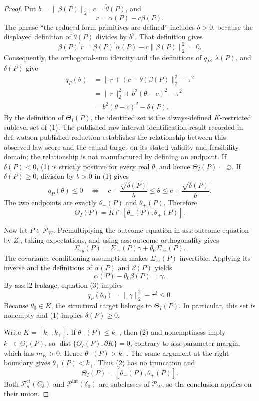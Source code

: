 \documentclass{article}
\begin{document}
\begin{proof}
Put \(b=\|\beta(P)\|_2\), \(c=\check\theta(P)\), and
\[
 r=\alpha(P)-c\beta(P).
\]
The phrase ``the reduced-form primitives are defined'' includes \(b>0\), because the displayed definition of \(\check\theta(P)\) divides by \(b^2\). That definition gives
\[
 \beta(P)^{\prime}r
 =\beta(P)^{\prime}\alpha(P)-c\|\beta(P)\|_2^2=0.
\]
Consequently, the orthogonal-sum identity and the definitions of \(q_P\), \(\lambda(P)\), and \(\delta(P)\) give
\[
 \begin{aligned}
 q_P(\theta)
 &=\|r+(c-\theta)\beta(P)\|_2^2-\tau^2\\
 &=\|r\|_2^2+b^2(\theta-c)^2-\tau^2\\
 &=b^2(\theta-c)^2-\delta(P). \tag{1}
 \end{aligned}
\]
By the definition of \(\Theta_I(P)\), the identified set is the always-defined \(K\)-restricted sublevel set of (1). The published raw-interval identification result recorded in \(\mathrm{def:watson\mbox{-}published\mbox{-}reduction}\) establishes the relationship between this observed-law score and the causal target on its stated validity and feasibility domain; the relationship is not manufactured by defining an endpoint. If \(\delta(P)<0\), (1) is strictly positive for every real \(\theta\), and hence \(\Theta_I(P)=\varnothing\). If \(\delta(P)\geq0\), division by \(b>0\) in (1) gives
\[
 q_P(\theta)\leq0
 \quad\Longleftrightarrow\quad
 c-\frac{\sqrt{\delta(P)}}{b}\leq\theta\leq
 c+\frac{\sqrt{\delta(P)}}{b}.
\]
The two endpoints are exactly \(\theta_-(P)\) and \(\theta_+(P)\). Therefore
\[
 \Theta_I(P)=K\cap[\theta_-(P),\theta_+(P)]. \tag{2}
\]

Now let \(P\in\mathcal P_W\). Premultiplying the outcome equation in \(\mathrm{ass:outcome\mbox{-}equation}\) by \(Z_i\), taking expectations, and using \(\mathrm{ass:outcome\mbox{-}orthogonality}\) gives
\[
 \Sigma_{zy}(P)=\Sigma_{zz}(P)\gamma+
 \theta_0\Sigma_{zx}(P).
\]
The covariance-conditioning assumption makes \(\Sigma_{zz}(P)\) invertible. Applying its inverse and the definitions of \(\alpha(P)\) and \(\beta(P)\) yields
\[
 \alpha(P)-\theta_0\beta(P)=\gamma. \tag{3}
\]
By \(\mathrm{ass:l2\mbox{-}leakage}\), equation (3) implies
\[
 q_P(\theta_0)=\|\gamma\|_2^2-\tau^2\leq0.
\]
Because \(\theta_0\in K\), the structural target belongs to \(\Theta_I(P)\). In particular, this set is nonempty and (1) implies \(\delta(P)\geq0\).

Write \(K=[k_-,k_+]\). If \(\theta_-(P)\leq k_-\), then (2) and nonemptiness imply \(k_-\in\Theta_I(P)\), so \(\operatorname{dist}\{\Theta_I(P),\partial K\}=0\), contrary to \(\mathrm{ass:parameter\mbox{-}margin}\), which has \(m_K>0\). Hence \(\theta_-(P)>k_-\). The same argument at the right boundary gives \(\theta_+(P)<k_+\). Thus (2) has no truncation and
\[
 \Theta_I(P)=[\theta_-(P),\theta_+(P)].
\]
Both \(\mathcal P_n^{\mathrm{ct}}(C_\delta)\) and \(\mathcal P^{\mathrm{int}}(\delta_0)\) are subclasses of \(\mathcal P_W\), so the conclusion applies on their union.
\end{proof}
\end{document}
